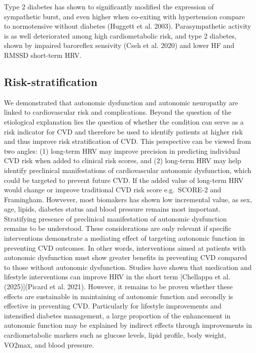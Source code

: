 \documentclass[
  a4paper,
  headsepline=true,
  open=any]{scrbook}
\begin{document}
Type 2 diabetes has shown to significantly modified the expression of
sympathetic burst, and even higher when co-exiting with hypertension
compare to normotensive without diabetes (Huggett et al. 2003).
Parasympathetic activity is as well deteriorated among high
cardiometabolic risk, and type 2 diabetes, shown by impaired baroreflex
sensivity (Cseh et al. 2020) and lower HF and RMSSD short-term HRV.

\hypertarget{risk-stratification-1}{%
\subsection{Risk-stratification}\label{risk-stratification-1}}

We demonstrated that autonomic dysfunction and autonomic neuropathy are
linked to cardiovascular risk and complications. Beyond the question of
the etiological explanation lies the question of whether the condition
can serve as a risk indicator for CVD and therefore be used to identify
patients at higher risk and thus improve risk stratification of CVD.
This perspective can be viewed from two angles: (1) long-term HRV may
improve precision in predicting individual CVD risk when added to
clinical risk scores, and (2) long-term HRV may help identify
preclinical manifestations of cardiovascular autonomic dysfunction,
which could be targeted to prevent future CVD. If the added value of
long-term HRV would change or improve traditional CVD risk score
e.g.~SCORE-2 and Framingham. Howvever, most biomakers has shown low
incremental value, as sex, age, lipids, diabetes status and blood
pressure remains most important. Stratifying presence of preclinical
manifestation of autonomic dysfunction remains to be understood. These
considerations are only relevant if specific interventions demonstrate a
mediating effect of targeting autonomic function in preventing CVD
outcomes. In other words, interventions aimed at patients with autonomic
dysfunction must show greater benefits in preventing CVD compared to
those without autonomic dysfunction. Studies have shown that medication
and lifestyle interventions can improve HRV in the short term
{[}Chellappa et al. (2025){]}(Picard et al. 2021). However, it remains
to be proven whether these effects are sustainable in maintaining of
autonomic function and secondly is effective in preventing CVD.
Particularly for lifestyle improvements and intensified diabetes
management, a large proportion of the enhancement in autonomic function
may be explained by indirect effects through improvements in
cardiometabolic markers such as glucose levels, lipid profile, body
weight, VO2max, and blood pressure.
\end{document}
